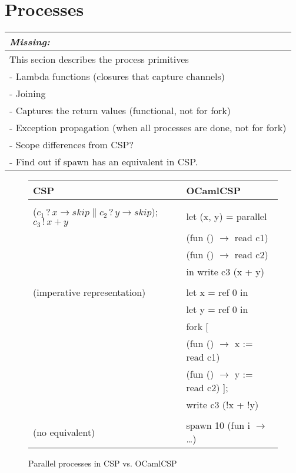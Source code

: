 \documentclass[11pt,oneside,a4paper]{article}
\newcommand{\missing}[1]{
\begin{tabular}{|p{11cm}|}
\hline
\emph{Missing:} \\
\hline
#1
\hline
\end{tabular}
}
\begin{document}
\section{Processes}
\missing{
This secion describes the process primitives \\
- Lambda functions (closures that capture channels) \\
- Joining \\
- Captures the return values (functional, not for fork) \\
- Exception propagation (when all processes are done, not for fork) \\
- Scope differences from CSP? \\
- Find out if spawn has an equivalent in CSP. \\
}

\begin{figure}[h]
\centering
\begin{tabular}{l|l}
CSP & OCamlCSP \\
\hline
& \\
($c_1\,?\,x \to skip \parallel c_2\,?\,y \to skip$); $c_3\,!\,x + y$ & let (x, y) = parallel \\
& \quad (fun () $\to$ read c1) \\
& \quad (fun () $\to$ read c2) \\
& in write c3 (x + y) \\
& \\
(imperative representation) & let x = ref 0 in \\
& let y = ref 0 in \\
& fork [ \\
& \quad (fun () $\to$ x := read c1) \\
& \quad (fun () $\to$ y := read c2) ]; \\
& write c3 (!x + !y) \\
& \\
(no equivalent) & spawn 10 (fun i $\to$ \dots) \\
\end{tabular}
\caption{Parallel processes in CSP vs. OCamlCSP}
\label{channel-processes}
\end{figure}
\end{document}
